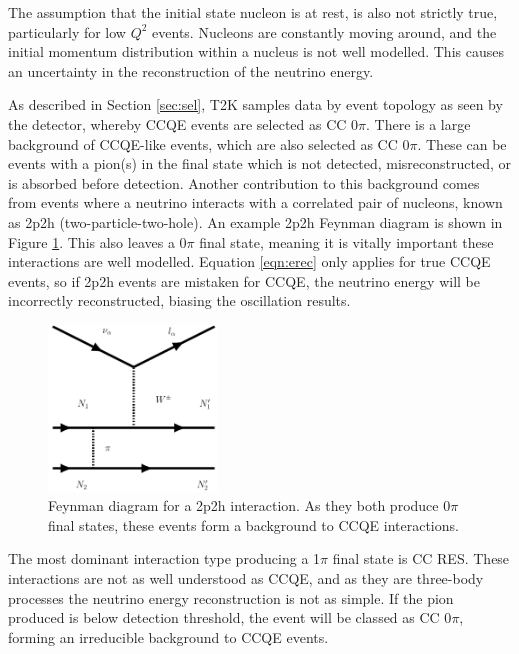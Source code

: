 The assumption that the initial state nucleon is at rest, is also not strictly true, particularly for low $Q^2$ events. Nucleons are constantly moving around, and the initial momentum distribution within a nucleus is not well modelled. This causes an uncertainty in the reconstruction of the neutrino energy.

As described in Section \ref{sec:sel}, T2K samples data by event topology as seen by the detector, whereby CCQE events are selected as CC 0$\pi$. There is a large background of CCQE-like events, which are also selected as CC 0$\pi$. These can be events with a pion(s) in the final state which is not detected, misreconstructed, or is absorbed before detection. Another contribution to this background comes from events where a neutrino interacts with a correlated pair of nucleons, known as 2p2h (two-particle-two-hole). An example 2p2h Feynman diagram is shown in Figure \ref{2p2hdiagram}. This also leaves a 0$\pi$ final state, meaning it is vitally important these interactions are well modelled. Equation \ref{eqn:erec} only applies for true CCQE events, so if 2p2h events are mistaken for CCQE, the neutrino energy will be incorrectly reconstructed, biasing the oscillation results.

\begin{figure}[!htbp]
\vspace{20pt}
\centering
\includegraphics*[width=0.4\textwidth,clip]{figs/feynman2p2h}
\caption{Feynman diagram for a 2p2h interaction. As they both produce 0$\pi$ final states, these events form a background to CCQE interactions.
} \label{2p2hdiagram}
\end{figure}

The most dominant interaction type producing a 1$\pi$ final state is CC RES. These interactions are not as well understood as CCQE, and as they are three-body processes the neutrino energy reconstruction is not as simple. If the pion produced is below detection threshold, the event will be classed as CC 0$\pi$, forming an irreducible background to CCQE events. 

